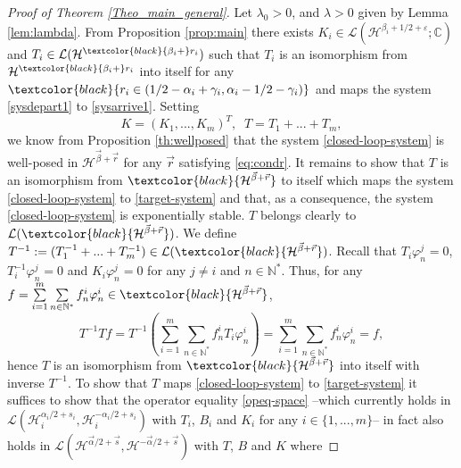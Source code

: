 \documentclass[11pt, dvipsnames]{amsart}
\begin{document}
\begin{proof}[Proof of Theorem \ref{Theo_main_general}]
Let $\lambda_{0}>0$, and $\lambda>0$ given by Lemma \ref{lem:lambda}. From Proposition \ref{prop:main} there exists $K_{i}\in\mathcal{L}(\mathcal{H}^{\beta_{i}+1/2+\varepsilon};\mathbb{C})$ and $T_{i}\in\mathcal{L}(\mathcal{H}^{\textcolor{black}{\beta_{i}+}r_{i}})$ such that $T_{i}$ is an isomorphism from $\mathcal{H}^{\textcolor{black}{\beta_{i}+}r_{i}}$ into itself for any $\textcolor{black}{r_{i}\in(1/2-\alpha_{i}+\gamma_{i},\alpha_{i}-1/2-\gamma_{i})}$ and maps the system \eqref{sysdepart1} to \eqref{sysarrive1}. Setting
\begin{equation}
K = (K_{1},...,K_{m})^{T},\;\;T=T_{1}+...+T_{m},
\end{equation}
we know from Proposition \ref{th:wellposed} that the system \eqref{closed-loop-system} is well-posed in \textcolor{black}{$\mathcal{H}^{\vec{\beta}+\vec{r}}$} for any \textcolor{black}{$\vec{r}$} satisfying \eqref{eq:condr}. It remains to show that $T$ is an isomorphism from $\textcolor{black}{\mathcal{H}^{\vec{\beta}+\vec{r}}}$ to itself which maps the system \eqref{closed-loop-system} to \eqref{target-system} and that, as a consequence, the system \eqref{closed-loop-system} is exponentially stable. $T$ belongs clearly to $\mathcal{L}(\textcolor{black}{\mathcal{H}^{\vec{\beta}+\vec{r}}})$. We define $T^{-1}:=(T_{1}^{-1}+...+T_{m}^{-1})\in\mathcal{L}(\textcolor{black}{\mathcal{H}^{\vec{\beta}+\vec{r}}})$. Recall that $T_{i}\varphi_{n}^{j} = 0$, $T_{i}^{-1}\varphi_{n}^{j} = 0$ and $K_{i}\varphi_{n}^{j}=0$ for any $j\neq i$ and $n\in\mathbb{N}^{*}$. Thus, for any $f = \sum\limits_{i=1}^{m}\sum\limits_{n\in\mathbb{N}^{*}}f_{n}^{i}\varphi_{n}^{i}\in\textcolor{black}{\mathcal{H}^{\vec{\beta}+\vec{r}}}$, 
\begin{equation}
    T^{-1}Tf = T^{-1}\left(\sum\limits_{i=1}^{m}\sum\limits_{n\in\mathbb{N}^{*}}f_{n}^{i}T_{i}\varphi_{n}^{i}\right) = \sum\limits_{i=1}^{m}\sum\limits_{n\in\mathbb{N}^{*}}f_{n}^{i}\varphi_{n}^{i} = f,
\end{equation}
hence $T$ is an isomorphism from $\textcolor{black}{\mathcal{H}^{\vec{\beta}+\vec{r}}}$ into itself with inverse $T^{-1}$.  To show that $T$ maps \eqref{closed-loop-system} to \eqref{target-system} it suffices to show that the operator equality \eqref{opeq-space} --which currently holds in $\mathcal{L}(\mathcal{H}_{i}^{\alpha_{i}/2+s_{i}},\mathcal{H}_{i}^{-\alpha_{i}/2+s_{i}})$ with $T_{i}$, $B_{i}$ and $K_{i}$ for any $i\in\{1,...,m\}$-- in fact also holds in 
$\mathcal{L}(\mathcal{H}^{\vec \alpha/2+\vec s},\mathcal{H}^{-\vec \alpha/2+\vec s})$ with $T$, $B$ and $K$ where

\end{proof}
\end{document}
